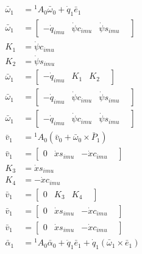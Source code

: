 
\begin{align}
 \bar\omega_{1} &= {}^{1}A_{0} \bar\omega_{0} + \dot{q}_{1} \bar{e}_{1} 
 \nonumber \\ 
 \bar\omega_{1} &= \left[\begin{matrix} -\dot{q}_{imu} & \dot{\psi}c_{imu} & \dot{\psi}s_{imu} &  \end{matrix}\right] 
 \nonumber \\ 
K_{1} &= \dot{\psi}c_{imu} \nonumber \\
K_{2} &= \dot{\psi}s_{imu} \nonumber \\
 \bar\omega_{1} &= \left[\begin{matrix} -\dot{q}_{imu} & K_{1} & K_{2} &  \end{matrix}\right] 
 \nonumber \\ 
 \bar\omega_{1} &= \left[\begin{matrix} -\dot{q}_{imu} & \dot{\psi}c_{imu} & \dot{\psi}s_{imu} &  \end{matrix}\right] 
 \nonumber \\ 
 \bar\omega_{1} &= \left[\begin{matrix} -\dot{q}_{imu} & \dot{\psi}c_{imu} & \dot{\psi}s_{imu} &  \end{matrix}\right] 
 \nonumber \\ 
 \bar{v}_{1} &= {}^{1}A_{0} \left(\bar{v}_{0} + \bar\omega_{0} \times \bar{P}_{1}\right) 
 \nonumber \\ 
 \bar{v}_{1} &= \left[\begin{matrix} 0 & \dot{x}s_{imu} & -\dot{x}c_{imu} &  \end{matrix}\right] 
 \nonumber \\ 
K_{3} &= \dot{x}s_{imu} \nonumber \\
K_{4} &= -\dot{x}c_{imu} \nonumber \\
 \bar{v}_{1} &= \left[\begin{matrix} 0 & K_{3} & K_{4} &  \end{matrix}\right] 
 \nonumber \\ 
 \bar{v}_{1} &= \left[\begin{matrix} 0 & \dot{x}s_{imu} & -\dot{x}c_{imu} &  \end{matrix}\right] 
 \nonumber \\ 
 \bar{v}_{1} &= \left[\begin{matrix} 0 & \dot{x}s_{imu} & -\dot{x}c_{imu} &  \end{matrix}\right] 
 \nonumber \\ 
 \bar\alpha_{1} &= {}^{1}A_{0} \bar\alpha_{0} + \ddot{q}_{1} \bar{e}_{1} + \dot{q}_{1} \left(\bar\omega_{1} \times \bar{e}_{1}\right) 

\end{align}
